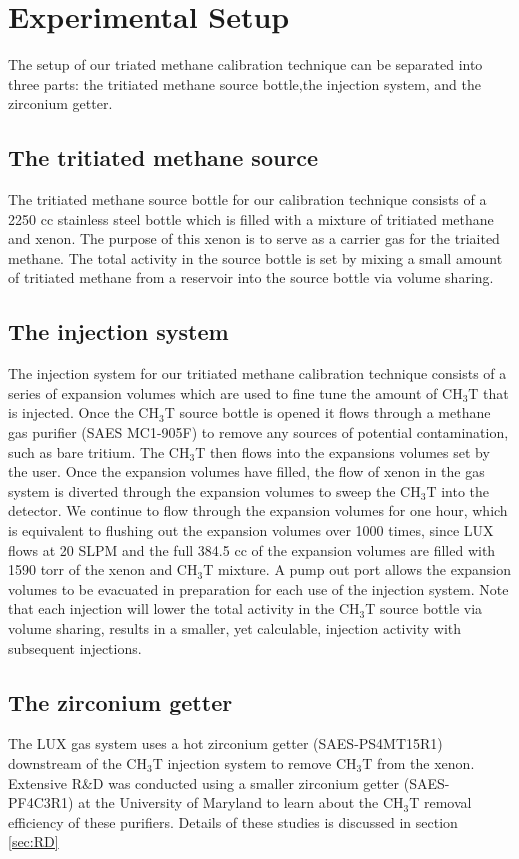 \section{Experimental Setup}

The setup of our triated methane calibration technique can be separated into three parts: the tritiated methane source bottle,the injection system,  and the zirconium getter.

\subsection{The tritiated methane source}

The tritiated methane source bottle for our calibration technique consists of a 2250 cc stainless steel bottle which is filled with a mixture of tritiated methane and xenon.  The purpose of this xenon is to serve as a carrier gas for the triaited methane.  The total activity in the source bottle is set by mixing a small amount of tritiated methane from a reservoir into the source bottle via volume sharing.

\subsection{The injection system}

The injection system for our tritiated methane calibration technique consists of a series of expansion volumes which are used to fine tune the amount of CH$_3$T that is injected.  Once the CH$_3$T source bottle is opened it flows through a methane gas purifier (SAES MC1-905F) to remove any sources of potential contamination, such as bare tritium.  The CH$_3$T then flows into the expansions volumes set by the user.   Once the expansion volumes have filled, the flow of xenon in the gas system is diverted through the expansion volumes to sweep the CH$_3$T into the detector.  We continue to flow through the expansion volumes for one hour, which is equivalent to flushing out the expansion volumes over 1000 times, since LUX flows at 20 SLPM and the full 384.5 cc of the expansion volumes are filled with 1590 torr of the xenon and CH$_3$T mixture.  A pump out port allows the expansion volumes to be evacuated in preparation for each use of the injection system.  Note that each injection will lower the total activity in the CH$_3$T source bottle via volume sharing, results in a smaller, yet calculable, injection activity with subsequent injections. 

\subsection{The zirconium getter}

The LUX gas system uses a hot zirconium getter (SAES-PS4MT15R1) downstream of the CH$_3$T injection system to remove CH$_3$T from the xenon.  Extensive R\&D was conducted using a smaller zirconium getter (SAES-PF4C3R1) at the University of Maryland to learn about the CH$_3$T removal efficiency of these purifiers.  Details of these studies is discussed in section \ref{sec:RD} 